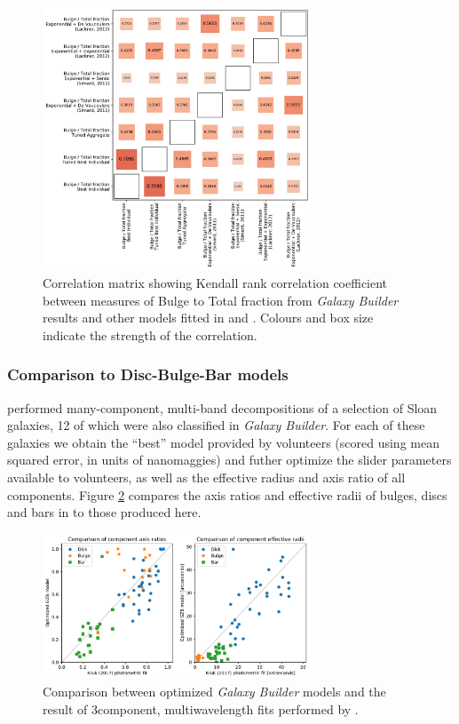 \documentclass[../main.tex]{subfiles}
\begin{document}
\begin{figure}
  \includegraphics[width=8cm]{images__results/b-t_comparison_correlation.pdf}
  \caption{Correlation matrix showing Kendall rank correlation coefficient between measures of Bulge to Total fraction from \textit{Galaxy Builder} results and other models fitted in \citet{Simard2011:1107.1518v1} and \citet{2012MNRAS.421.2277L}. Colours and box size indicate the strength of the correlation.}
  \label{fig:bt_correlation}
\end{figure}


\subsubsection{Comparison to Disc-Bulge-Bar models}

\citet{Kruk2017:1710.00093v2} performed many-component, multi-band decompositions of a selection of Sloan galaxies, 12 of which were also classified in \textit{Galaxy Builder}. For each of these galaxies we obtain the ``best'' model provided by volunteers (scored using mean squared error, in units of nanomaggies) and futher optimize the slider parameters available to volunteers, as well as the effective radius and axis ratio of all components. Figure \ref{fig:sd_comp_comparison} compares the axis ratios and effective radii of bulges, discs and bars in \citet{Kruk2017:1710.00093v2} to those produced here.

\begin{figure}
  \includegraphics[width=8cm]{images__results/sd_comp_comparison.pdf}
  \caption{Comparison between optimized \textit{Galaxy Builder} models and the result of 3\-component, multi\-wavelength fits performed by \citet{Kruk2017:1710.00093v2}.}
  \label{fig:sd_comp_comparison}
\end{figure}
\end{document}
